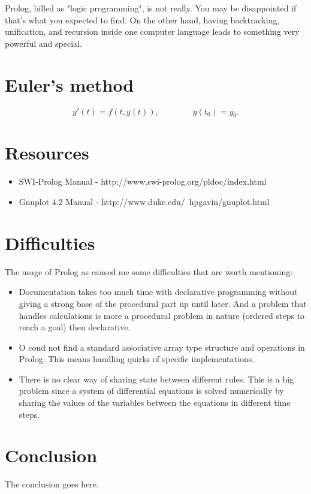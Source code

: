 \documentclass[journal]{IEEEtran}
\begin{document}
Prolog, billed as "logic programming", is not really. You may be disappointed if that's what you expected to find. On the other hand, having backtracking, unification, and recursion inside one computer language leads to something very powerful and special.\cite{merritt1992}


\section{Euler's method}
\begin{equation}
y'(t) = f(t,y(t)), \qquad \qquad y(t_0)=y_0.
\end{equation}

\section{Resources}
\begin{itemize}
\item SWI-Prolog Manual - http://www.swi-prolog.org/pldoc/index.html
\item Gnuplot 4.2 Manual - http://www.duke.edu/~hpgavin/gnuplot.html
\end{itemize}

\section{Difficulties}

The usage of Prolog as caused me some difficulties that are worth mentioning:
\begin{itemize}
\item Documentation takes too much time with declarative programming without giving a strong base of the procedural part up until later. And a problem that handles calculations is more a procedural problem in nature (ordered steps to reach a goal) then declarative.
\item O coud not find a standard associative array type structure and operations in Prolog. This means handling quirks of specific implementations.
\item There is no clear way of sharing state between different rules. This is a big problem since a system of differential equations is solved numerically by sharing the values of the variables between the equations in different time steps.
\end{itemize}

\section{Conclusion}
The conclusion goes here.


\ifCLASSOPTIONcaptionsoff
  \newpage
\fi



\end{document}
